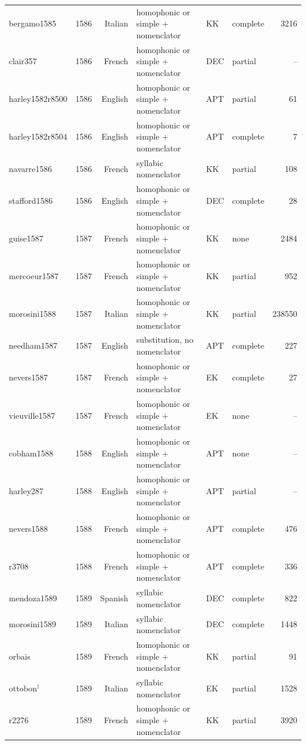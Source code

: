 {\begin{longtable}{@{}llrlllr@{}}
bergamo1585 & 1586 & Italian & homophonic or simple + nomenclator & KK & complete & 3216 \\
clair357 & 1586 & French & homophonic or simple + nomenclator & DEC & partial & -- \\
harley1582r8500 & 1586 & English & homophonic or simple + nomenclator & APT & partial & 61 \\
harley1582r8504 & 1586 & English & homophonic or simple + nomenclator & APT & complete & 7 \\
navarre1586 & 1586 & French & syllabic nomenclator & KK & partial & 108 \\
stafford1586 & 1586 & English & homophonic or simple + nomenclator & DEC & complete & 28 \\
guise1587 & 1587 & French & homophonic or simple + nomenclator & KK & none & 2484 \\
mercoeur1587 & 1587 & French & homophonic or simple + nomenclator & KK & partial & 952 \\
morosini1588 & 1587 & Italian & homophonic or simple + nomenclator & KK & partial & 238550 \\
needham1587 & 1587 & English & substitution, no nomenclator & APT & complete & 227 \\
nevers1587 & 1587 & French & homophonic or simple + nomenclator & EK & complete & 27 \\
vieuville1587 & 1587 & French & homophonic or simple + nomenclator & EK & none & -- \\
cobham1588 & 1588 & English & homophonic or simple + nomenclator & APT & none & -- \\
harley287 & 1588 & English & homophonic or simple + nomenclator & APT & partial & -- \\
nevers1588 & 1588 & French & homophonic or simple + nomenclator & APT & complete & 476 \\
r3708 & 1588 & French & homophonic or simple + nomenclator & APT & complete & 336 \\
mendoza1589 & 1589 & Spanish & syllabic nomenclator & DEC & complete & 822 \\
morosini1589 & 1589 & Italian & syllabic nomenclator & DEC & complete & 1448 \\
orbais & 1589 & French & homophonic or simple + nomenclator & KK & partial & 91 \\
ottobon$^\dagger$ & 1589 & Italian & syllabic nomenclator & EK & partial & 1528 \\
r2276 & 1589 & French & homophonic or simple + nomenclator & KK & partial & 3920 \\

\end{longtable}}
